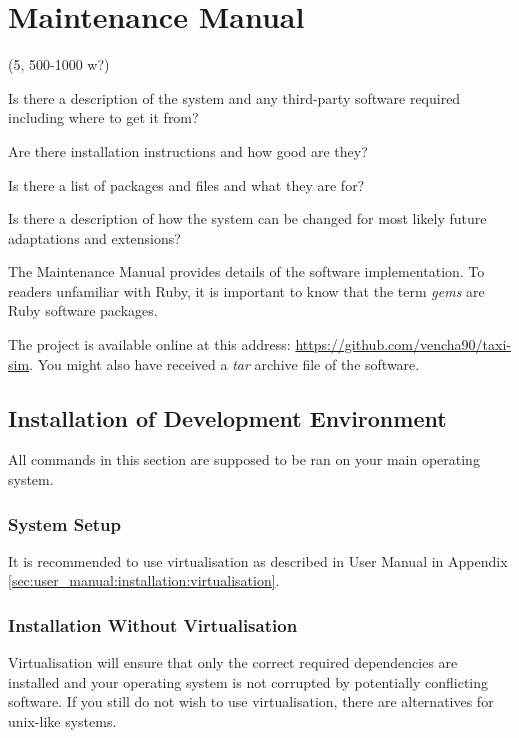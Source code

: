 \clearpage
\section{Maintenance Manual}
\label{sec:maintenance_manual}

(5, 500-1000 w?)

Is there a description of the system and any third-party software required
including where to get it from?

Are there installation instructions and how good are they?

Is there a list of packages and files and what they are for?

Is there a description of how the system can be changed for most likely future
adaptations and extensions?



The Maintenance Manual provides details of the software implementation. To
readers unfamiliar with Ruby, it is important to know that the term
\textit{gems} are Ruby software packages.

The project is available online at this address:
\url{https://github.com/vencha90/taxi-sim}. You might also have received a
\textit{tar} archive file of the software.



\subsection{Installation of Development Environment}

All commands in this section are supposed to be ran on your main operating
system.

\subsubsection{System Setup}

It is recommended to use virtualisation as described in User Manual in Appendix
\ref{sec:user_manual:installation:virtualisation}.


\subsubsection{Installation Without Virtualisation}
\label{sec:maintenance_manual:native_install}

Virtualisation will ensure that only the correct required dependencies are
installed and your operating system is not corrupted by potentially conflicting
software. If you still do not wish to use virtualisation, there are
alternatives for unix-like systems.

